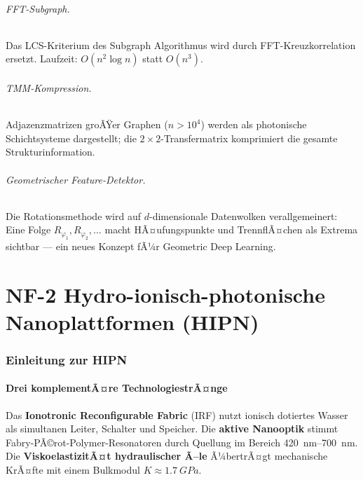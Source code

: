 ﻿\documentclass[a4paper,12pt]{scrreprt}
\theoremstyle{definition}
\begin{document}
\paragraph{FFT-Subgraph.} Das LCS-Kriterium des Subgraph Algorithmus wird
durch FFT-Kreuzkorrelation ersetzt. Laufzeit: $O(n^2 \log n)$ statt
$O(n^3)$.

\paragraph{TMM-Kompression.} Adjazenzmatrizen groÃŸer Graphen ($n>10^4$)
werden als photonische Schichtsysteme dargestellt; die $2\times 2$-Transfermatrix
komprimiert die gesamte Strukturinformation.

\paragraph{Geometrischer Feature-Detektor.} Die Rotationsmethode wird
auf $d$-dimensionale Datenwolken verallgemeinert: Eine Folge
$R_{\varphi_1},R_{\varphi_2},\ldots$ macht HÃ¤ufungspunkte und TrennflÃ¤chen
als Extrema sichtbar --- ein neues Konzept fÃ¼r Geometric Deep Learning.

\part{NF-2 \quad Hydro-ionisch-photonische Nanoplattformen (HIPN)}
\label{part:nf2}

\section{Einleitung zur HIPN}

\subsection{Drei komplementÃ¤re TechnologiestrÃ¤nge}

Das \textbf{Ionotronic Reconfigurable Fabric} (IRF) nutzt ionisch
dotiertes Wasser als simultanen Leiter, Schalter und Speicher. Die
\textbf{aktive Nanooptik} stimmt Fabry-PÃ©rot-Polymer-Resonatoren durch
Quellung im Bereich \SIrange{420}{700}{nm}. Die \textbf{ViskoelastizitÃ¤t
hydraulischer Ã–le} Ã¼bertrÃ¤gt mechanische KrÃ¤fte mit einem Bulkmodul
$K \approx \SI{1.7}{GPa}$.
\end{document}
